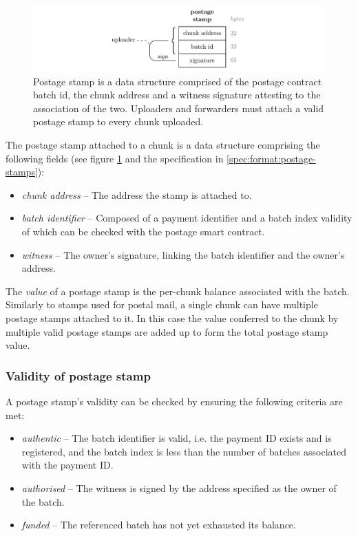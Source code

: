 \begin{figure}[htbp]
  \centering
    \includegraphics[width=\textwidth]{fig/postage-stamp-structure.pdf}
  \caption[Postage stamp \statusgreen]{Postage stamp is a data structure comprised of the postage contract batch id, the chunk address and a witness signature attesting to the association of the two. Uploaders and forwarders must attach a valid postage stamp to every chunk uploaded. }
  \label{fig:postage-stamp}
\end{figure}


The postage stamp attached to a chunk is a data structure comprising the following fields (see figure  \ref{fig:postage-stamp}  and the specification in \ref{spec:format:postage-stamps}):

\begin{itemize}
    \item \emph{chunk address} -- The address the stamp is attached to. 
    \item \emph{batch identifier} -- Composed of a payment identifier and a batch index validity of which can be checked with the postage smart contract.
    \item \emph{witness} -- The owner's signature, linking the batch identifier and the owner's address.
\end{itemize}

The \emph{value} of a postage stamp is the per-chunk balance associated with the batch.
Similarly to stamps used for postal mail, a single chunk can have multiple postage stamps attached to it. In this case the value conferred to the chunk by multiple valid postage stamps are added up to form the total postage stamp value. 

\subsubsection{Validity of postage stamp}

A postage stamp's validity can be checked by ensuring the following criteria are met:

\begin{itemize}
\item \emph{authentic} -- The batch identifier is valid, i.e. the payment ID exists and is registered, and the batch index is less than the number of batches associated with the payment ID.
\item \emph{authorised} -- The witness is signed by the address specified as the owner of the batch.
\item \emph{funded} -- The referenced batch has not yet exhausted its balance. 
\end{itemize}

